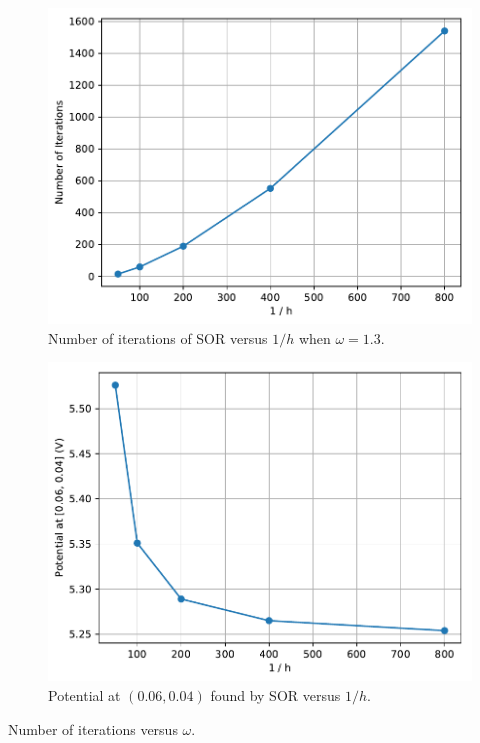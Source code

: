 \documentclass[a4paper,titlepage]{article}
\begin{document}
	\begin{figure}[!htb]
		\centering
		\includegraphics[width=\columnwidth]{plots/q3c_iterations.pdf}
		\caption
		{Number of iterations of SOR versus $1/h$ when $\omega=1.3$.}
		\label{fig:q3c_iterations}
	\end{figure}

	\begin{figure}[!htb]
		\centering
		\includegraphics[width=\columnwidth]{plots/q3c_potential.pdf}
		\caption
		{Potential at $(0.06, 0.04)$ found by SOR versus $1/h$.}
		\label{fig:q3c_potential}
	\end{figure}

	\begin{table}[!htb]
		\centering
		\caption{Number of iterations versus $\omega$.}
		\label{tabel:q3c_iterations}
	\end{table}
	
\end{document}
